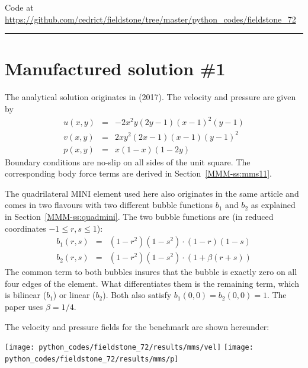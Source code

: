 

\begin{center}
Code at \url{https://github.com/cedrict/fieldstone/tree/master/python_codes/fieldstone_72}
\end{center}

\par\noindent\rule{\textwidth}{0.4pt}




\section*{Manufactured solution \#1}

The analytical solution originates in \textcite{lami17} (2017).
The velocity and pressure are given by
\begin{eqnarray}
u(x,y)&=&-2x^2y(2y-1)(x-1)^2(y-1) \\
v(x,y)&=& 2xy^2(2x-1)(x-1)(y-1)^2 \\
p(x,y)&=& x(1-x)(1-2y)
\end{eqnarray}
Boundary conditions are no-slip on all sides of the unit square. 
The corresponding body force terms are derived in Section~\ref{MMM-ss:mms11}. 


The quadrilateral MINI element used here also originates in the same article 
and comes in two flavours with two different bubble functions $b_1$ and $b_2$
as explained in Section~\ref{MMM-ss:quadmini}.
The two bubble functions are (in reduced coordinates $-1 \leq r,s \leq 1$):
\begin{eqnarray}
b_1(r,s) &=& (1-r^2)(1-s^2)\cdot (1-r)(1-s)\\
b_2(r,s) &=& (1-r^2)(1-s^2)\cdot (1+\beta(r+s))
\end{eqnarray}
The common term to both bubbles insures that the bubble is exactly zero on all four edges of the 
element. What differentiates them is the remaining term, which is bilinear ($b_1$) or linear ($b_2$). 
Both also satisfy $b_1(0,0)=b_2(0,0)=1$. The paper uses $\beta=1/4$.

The velocity and pressure fields for the benchmark are shown hereunder:
\begin{center}
\texttt{[image: python\_codes/fieldstone\_72/results/mms/vel]}
\texttt{[image: python\_codes/fieldstone\_72/results/mms/p]}
\end{center}

